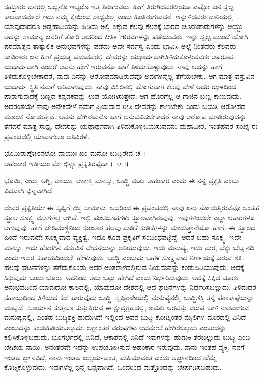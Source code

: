 ಸಹಸ್ರಾರು ಜನರಲ್ಲಿ ಒಬ್ಬನೊ ಇಬ್ಬರೊ ಇತ್ತ ತಿರುಗುವರು. ಹೀಗೆ ತಿರುಗಿದವರಲ್ಲಿಯೂ ಎಷ್ಟೋ ಜನ ಸ್ವಲ್ಪ ಕಾಲವಾದಮೇಲೆ ಇದು ನಮ್ಮ ಕೈಯಿಂದ ಸಾಧ್ಯವಿಲ್ಲ ಎಂದು ಹಿಂತಿರುಗುವವರೆ. ಇನ್ನುಳಿದವರು ದಾರಿಯಲ್ಲಿ ಯಾವುದಾದರೂ ಅಡ್ಡಹಾದಿಯನ್ನು ಹಿಡಿದು ಅಲ್ಲಿ ಸಿಕ್ಕುವ ಕೆಲವು ಕೆಲಸಕ್ಕೆ ಬಾರದ ಚೂರುಪಾರುಗಳನ್ನು ಆಯ್ದು ಅದನ್ನು ಸಾಮಾನ್ಯ ಜನರಿಗೆ ತೋರಿ ಅದರಿಂದ ಕೀರ್ತಿ ಗೌರವಗಳನ್ನು ಪಡೆಯುವರು. ಇನ್ನು ಸ್ವಲ್ಪ ಮುಂದೆ ಹೋಗಿ ಪರಮಾತ್ಮನ ತಾತ್ಕಾಲಿಕ ಅನುಭವಗಳನ್ನು ಪಡೆದು ಅದೇ ಸರ್ವಸ್ವ ಎಂದು ಭಾವಿಸಿ ಅಲ್ಲೆ ನಿಂತವರು ಕೆಲವರು. ಸಾವಿರಾರು ಜನ ಹೀಗೆ ಪ್ರಯತ್ನ ಪಡುವವರಲ್ಲಿ ದೇವರನ್ನು ಯಥಾರ್ಥವಾಗಿ\break ತಿಳಿದುಕೊಳ್ಳುವವರು ಅಪರೂಪ. ಯಥಾರ್ಥವಾಗಿ ಎಂದರೆ ಅವನು ಹೇಗೆ ಇರುವನೊ ಹಾಗೆ ತಿಳಿದುಕೊಳ್ಳುವುದು. ನಾವು ಅದನ್ನು ಹಾಗೆ ತಿಳಿದುಕೊಳ್ಳಬೇಕಾದರೆ, ನಾವು ಏನನ್ನು ಆರೋಪ\-ಮಾಡಿರುವೆವೊ ಅವುಗಳನ್ನೆಲ್ಲ ತೆಗೆಯಬೇಕು. ಆಗ ಮಾತ್ರ ವಸ್ತುವಿನ ಯಥಾರ್ಥ ಸ್ಥಿತಿ ನಮಗೆ ಅರಿವಾಗುವುದು. ನಾವು ಬಿಸಿಲಿನಲ್ಲಿ ಹೋಗುವಾಗ ಕೆಲವು ವೇಳೆ ಅದರ ಝಳದಿಂದ ಪಾರಾಗುವುದಕ್ಕೆ ಬಣ್ಣದ ಕನ್ನಡಕವನ್ನು ಉಪ ಯೋಗಿಸುತ್ತೇವೆ. ಆಗ ಹೊರಗೆಲ್ಲ ಆ ಗಾಜಿನ ಬಣ್ಣ ಕಾಣುವುದು. ಅದರಂತೆಯೇ ನಾವು ಅನೇಕವೇಳೆ ನಮಗೆ ಪ್ರಿಯವಾದ ರೀತಿ ದೇವರನ್ನು ಕಾಣಬೇಕು ಎಂದು ಬಯಸಿ ಆರೋಪದ ಮೂಲಕ ನೋಡುತ್ತೇವೆ. ಅವನು ಹೇಗಿರುವನೊ ಹಾಗೆ ಅನುಭವಿಸಬೇಕಾದರೆ ನಾವು ಆರೋಪ ಮಾಡಿರುವುದನ್ನು ತೆಗೆದರೆ ಮಾತ್ರ ಸಾಧ್ಯ. ದೇವರನ್ನು ಯಥಾರ್ಥವಾಗಿ ತಿಳಿದುಕೊಳ್ಳಬಯಸುವವನು ಮಹಾವೀರ. ಇಂತಹವರ ಸಂಖ್ಯೆ ಈ ಪ್ರಪಂಚದಲ್ಲಿ ಯಾವಾಗಲೂ ಅತಿವಿರಳ.

\begin{shloka}
ಭೂಮಿರಾಪೋಽನಲೋ ವಾಯುಃ ಖಂ ಮನೋ ಬುದ್ಧಿರೇವ ಚ~।\\ಅಹಂಕಾರ ಇತೀಯಂ ಮೇ ಭಿನ್ನಾ ಪ್ರಕೃತಿರಷ್ಟಧಾ \hfill॥ ೪~॥
\end{shloka}

\begin{artha}
ಭೂಮಿ, ನೀರು, ಅಗ್ನಿ, ವಾಯು, ಆಕಾಶ, ಮನಸ್ಸು, ಬುದ್ಧಿ ಮತ್ತು ಅಹಂಕಾರ ಎಂದು ಈ ನನ್ನ ಪ್ರಕೃತಿ ಎಂಟು ವಿಧವಾಗಿ ಭಿನ್ನವಾಗಿದೆ.
\end{artha}

ದೇವರ ಪ್ರಕೃತಿಯೇ ಈ ಸೃಷ್ಟಿಗೆ ಕಚ್ಚ ಸಾಮಾನು. ಅದರಿಂದ ಈ ಪ್ರಪಂಚದಲ್ಲಿ ನಾವು ಏನು ನೋಡುತ್ತಿರುವೆವೊ ಅಂತಹ ಸ್ಥೂಲ ಸೂಕ್ಷ್ಮ ವಸ್ತುಗಳೆಲ್ಲ ಆಗಿವೆ. ಇಲ್ಲಿ ಪಂಚಭೂತಗಳು ಸ್ಥೂಲವಾಗಿರುವುವು. ಇವುಗಳಿಂದಲೇ ಎಲ್ಲಾ ಆಕಾರಗಳೂ ಆಗುವುವು. ಹೇಗೆ ಜೇಡಿಮಣ್ಣಿನಿಂದ ಕುಂಬಾರ ಹಲವು ಮಡಿಕೆ ಕುಡಿಕೆಗಳನ್ನು ಮಾಡುತ್ತಾನೆಯೋ ಹಾಗೆ. ಈ ಸ್ಥೂಲದ ಹಿಂದೆ ಇರುವುದೇ ಸೂಕ್ಷ್ಮವಾದ ವ್ಯಕ್ತಿತ್ವ. ಇದೂ ಕೂಡ ಪ್ರಕೃತಿಗೆ ಸಂಬಂಧಪಟ್ಟಿದ್ದೆ. ಆದರೆ ಬಹು ಸೂಕ್ಷ್ಮ. ಇದೇ ಮನಸ್ಸು. ಇದು ಹೊರಗಿನ ವಸ್ತುವಿನ ವೇದನೆಯನ್ನು ಅರಿಯುವುದು. ಇದು ಮನುಷ್ಯ, ಇದು ಮರ, ಬೆಕ್ಕು ಬೆಟ್ಟ ನದಿ ಎಂದು ಇದರ ಸಹಾಯದಿಂದಲೇ ಹೇಳುವುದು. ಬುದ್ಧಿ ಎಂಬುದು ಬಹಳ ಸೂಕ್ಷ್ಮವಾದ ನಿರ್ಣಯಕ್ಕೆ ಬರುವ ಶಕ್ತಿ. ಹಲವು ಘಟನೆಗಳನ್ನು ತೆಗೆದುಕೊಂಡು ಅದರ ಅಂತರಾಳದಲ್ಲಿರುವ ನಿಯಮವನ್ನು ಕಂಡುಹಿಡಿಯುವುದು. ಅದಕ್ಕೆ ಸಿಕ್ಕುವುದು ಒಂದು ಚೂರು. ಅದರಿಂದ ಅದು ಒಟ್ಟು ಹೇಗಿದೆ ಎಂದು ನಿರ್ಧರಿಸುವುದು. ಅದಕ್ಕೆ ಸಿಕ್ಕಿದ ಚೂರು ಅನುಭವದಿಂದ ಯಾವುದೋ ಕಾಲದಲ್ಲಿ, ಯಾವುದೋ ದೇಶದಲ್ಲಿ ಆದ ಘಟನೆಗಳನ್ನು ನಿರ್ಧರಿಸಬಲ್ಲುದು. ತಿಳಿದುದರ ಸಹಾಯದಿಂದ ತಿಳಿಯದ ಕಡೆ ಹಾರುವುದು ಬುದ್ಧಿ. ಸೃಷ್ಟಿರಾಶಿಯಲ್ಲಿ ಮನುಷ್ಯನಲ್ಲಿ, ಬುದ್ಧಿಶಕ್ತಿ ತನ್ನ ಪರಾಕಾಷ್ಠೆಯನ್ನು ಮುಟ್ಟಿದೆ. ಸೂರ್ಯನ ಸುತ್ತಲೂ ಸುತ್ತುತ್ತಿರುವ ಈ ಕ್ಷುದ್ರಗ್ರಹದಲ್ಲಿ, ಐವತ್ತು ಅರವತ್ತು ವರುಷ ಬಾಳಿ ನಾಶವಾಗುವ ಮನುಷ್ಯನಲ್ಲಿ, ಎಂತಹ ಬುದ್ಧಿಶಕ್ತಿ ಹುದುಗಿದೆ! ಇಲ್ಲಿಂದ ಅವನ ಬುದ್ಧಿ ಕೋಟ್ಯಂತರ ಮೈಲಿಗಳ ದೂರದಲ್ಲಿ ಏನಿದೆ ಎಂಬುದನ್ನು ಕಂಡುಹಿಡಿಯಬಲ್ಲುದು. ಲಕ್ಷಾಂತರ ವರುಷಗಳು ಆದಮೇಲೆ ಹೇಗಿರಬಲ್ಲದು ಎಂಬುದನ್ನು ಕಲ್ಪಿಸಿಕೊಳ್ಳಬಹುದು. ಭೂಗರ್ಭದಲ್ಲಿ ಏನಿದೆ, ಆಕಾಶದಲ್ಲಿ ಏನಿದೆ ಇವುಗಳನ್ನು ಹುಡುಕಿ ತರಬಲ್ಲುದು ಬುದ್ಧಿ ಎಂಬ ಬೇಟೆಯ ನಾಯಿ. ಅನಂತರವೇ ಇದನ್ನು ಉಪಯೋಗಿಸುವ ಅಹಂಕಾರ ಇರುವುದು. ನಾನು ಇಂತಹ ವ್ಯಕ್ತಿ, ನನಗೆ ಇಂತಹ ಜ್ಞಾನವಿದೆ, ನಾನು ಇಂತಹ ಐಶ್ವರ್ಯವಂತ, ಮಹಿಮಾವಂತ ಎಂದು ಅಜ್ಞಾನದಿಂದ ಹೆಮ್ಮೆ ಕೊಚ್ಚಿಕೊಳ್ಳುವುದು. ಇವುಗಳೆಲ್ಲ ಭಿನ್ನ ಭಿನ್ನವಾಗಿದೆ. ಒಂದರಿಂದ ಮತ್ತೊಂದನ್ನು ಬೇರ್ಪಡಿಸಬಹುದು.

